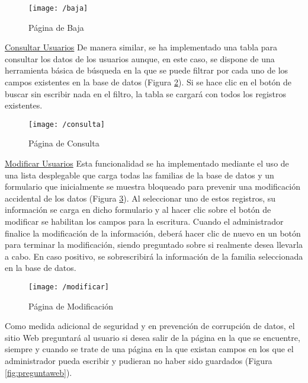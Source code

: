 \begin{figure}[!h]
	\begin{center}
		\texttt{[image: /baja]}
		\caption{Página de Baja}
		\label{fig:baja}
	\end{center}
\end{figure}

\noindent \underline{Consultar Usuarios} \newline
De manera similar, se ha implementado una tabla para consultar los datos de los usuarios aunque, en este caso, se dispone de una herramienta básica de búsqueda en la que se puede filtrar por cada uno de los campos existentes en la base de datos (Figura \ref{fig:consulta}). Si se hace clic en el botón de buscar sin escribir nada en el filtro, la tabla se cargará con todos los registros existentes.

\begin{figure}[!h]
	\begin{center}
		\texttt{[image: /consulta]}
		\caption{Página de Consulta}
		\label{fig:consulta}
	\end{center}
\end{figure}

\clearpage

\noindent \underline{Modificar Usuarios} \newline
Esta funcionalidad se ha implementado mediante el uso de una lista desplegable que carga todas las familias de la base de datos y un formulario que inicialmente se muestra bloqueado para prevenir una modificación accidental de los datos (Figura \ref{fig:modificar}). Al seleccionar uno de estos registros, su información se carga en dicho formulario y al hacer clic sobre el botón de modificar se habilitan los campos para la escritura. Cuando el administrador finalice la modificación de la información, deberá hacer clic de nuevo en un botón para terminar la modificación, siendo preguntado sobre si realmente desea llevarla a cabo. En caso positivo, se sobrescribirá la información de la familia seleccionada en la base de datos.

\begin{figure}[!h]
	\begin{center}
		\texttt{[image: /modificar]}
		\caption{Página de Modificación}
		\label{fig:modificar}
	\end{center}
\end{figure}

Como medida adicional de seguridad y en prevención de corrupción de datos, el sitio Web preguntará al usuario si desea salir de la página en la que se encuentre, siempre y cuando se trate de una página en la que existan campos en los que el administrador pueda escribir y pudieran no haber sido guardados (Figura \ref{fig:preguntaweb}).

